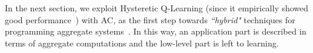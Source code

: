 \documentclass[conference]{IEEEtran}
\begin{document}
In the next section, we exploit Hysteretic Q-Learning (since it empirically showed good performance~\cite{DBLP:journals/tsg/HadidiJ13}) with AC, 
 as the first step towards \textit{``hybrid"} techniques for programming aggregate systems~\cite{research}.
 In this way, an application part is described in terms of aggregate computations and the low-level part is left to learning.





\end{document}
